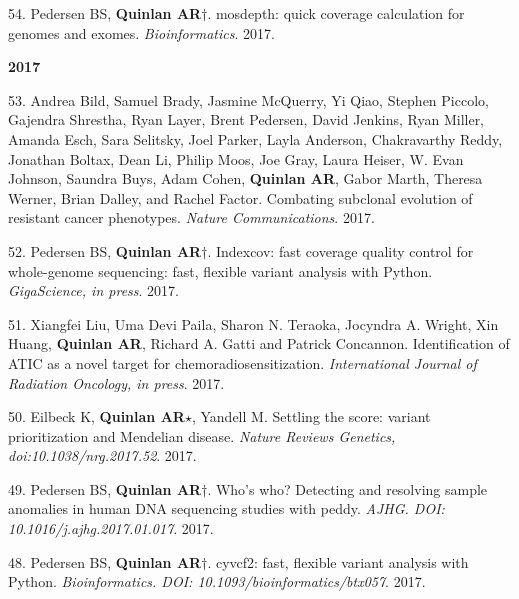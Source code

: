 \documentclass[margin,line]{cv}
\begin{document}
\begin{resume}
\begin{list}{*}{}
    \item[54.] Pedersen BS, \textbf{Quinlan AR}$\dagger$.
    mosdepth: quick coverage calculation for genomes and exomes. \emph{Bioinformatics}. 2017. 

    \end{list}
 

    \textbf{2017} \\

    \begin{list}{*}{}

    \item[53.] Andrea Bild, Samuel Brady, Jasmine McQuerry, Yi Qiao, Stephen Piccolo, Gajendra Shrestha, Ryan Layer, Brent Pedersen, David Jenkins, Ryan Miller, Amanda Esch, Sara Selitsky, Joel Parker, Layla Anderson, Chakravarthy Reddy, Jonathan Boltax, Dean Li, Philip Moos, Joe Gray, Laura Heiser, W. Evan Johnson, Saundra Buys, Adam Cohen,  \textbf{Quinlan AR}, Gabor Marth, Theresa Werner, Brian Dalley, and Rachel Factor.
    Combating subclonal evolution of resistant cancer phenotypes. \emph{Nature Communications}. 2017.

    \item[52.] Pedersen BS, \textbf{Quinlan AR}$\dagger$.
    Indexcov: fast coverage quality control for whole-genome sequencing: fast, flexible variant analysis with Python. \emph{GigaScience, in press}. 2017. 

    \item[51.] Xiangfei Liu, Uma Devi Paila, Sharon N. Teraoka, Jocyndra A. Wright, Xin Huang, \textbf{Quinlan AR}, Richard A. Gatti and Patrick Concannon.
    Identification of ATIC as a novel target for chemoradiosensitization. \emph{International Journal of Radiation Oncology, in press}. 2017.

    \item[50.] Eilbeck K, \textbf{Quinlan AR}$\star$, Yandell M.
    Settling the score: variant prioritization and Mendelian disease. \emph{Nature Reviews Genetics, doi:10.1038/nrg.2017.52}. 2017.

    \item[49.] Pedersen BS, \textbf{Quinlan AR}$\dagger$.
    Who's who? Detecting and resolving sample anomalies in human DNA  sequencing studies with ​peddy. \emph{AJHG. DOI: 10.1016/j.ajhg.2017.01.017}. 2017. 

    \item[48.] Pedersen BS, \textbf{Quinlan AR}$\dagger$.
    cyvcf2: fast, flexible variant analysis with Python. \emph{Bioinformatics. DOI: 10.1093/bioinformatics/btx057}. 2017. 


\end{list}
\end{resume}
\end{document}
